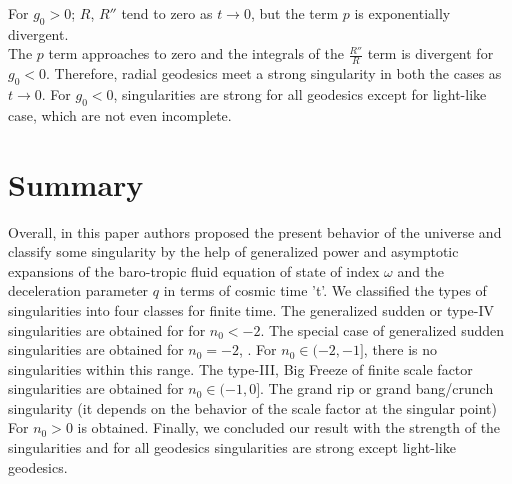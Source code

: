\documentclass[11pt]{article}
\theoremstyle{theorem}
\theoremstyle{defi}
\begin{document}
For $g_0>0$; $R$, $R''$ tend to zero as $t\to 0$, but the term $p$ is exponentially divergent. \\
The $p$ term approaches to zero and the integrals of the $\frac{R''}{R}$ term is divergent for $g_0<0$. Therefore, radial
geodesics meet a strong singularity in both the cases as $t\to 0$. For $g_0<0$, singularities are strong for all geodesics except for light-like case, which are not even incomplete.
\section{Summary}
Overall, in this paper authors proposed the present behavior of the universe and classify some singularity by the help of generalized power and asymptotic expansions of the baro-tropic fluid equation of state of index $\omega$ and the deceleration parameter $q$ in terms of cosmic time 't'.  We classified the types of singularities into four classes for finite time. The generalized sudden or type-IV singularities are obtained for for $n_0<-2$. The special case of generalized sudden singularities are obtained for $n_0=-2$, . For $n_0\in (-2, -1]$, there is no singularities within this range. The type-III, Big Freeze of finite scale factor singularities are obtained for $n_0\in (-1, 0]$. The grand rip or grand bang/crunch singularity (it depends on the behavior of the scale factor at the singular point)  For $n_0> 0$ is obtained. Finally, we concluded our result with the strength of the singularities and for all geodesics singularities are strong except light-like geodesics.
\end{document}
